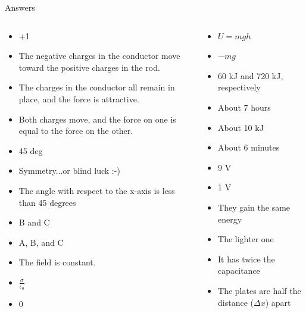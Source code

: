 \documentclass{beamer}
\begin{document}
\begin{frame}{Answers}
\small
\begin{columns}[T]
\begin{column}{0.5\textwidth}
\begin{itemize}
\item +1
\item The negative charges in the conductor move toward the positive charges in the rod.
\item The charges in the conductor all remain in place, and the force is attractive.
\item Both charges move, and the force on one is equal to the force on the other.
\item 45 deg
\item Symmetry...or blind luck :-)
\item The angle with respect to the x-axis is less than 45 degrees
\item B and C
\item A, B, and C
\item The field is constant.
\item $\frac{\sigma}{\epsilon_0}$
\item 0
\end{itemize}
\end{column}
\begin{column}{0.5\textwidth}
\begin{itemize}
\item $U = mgh$
\item $-mg$
\item 60 kJ and 720 kJ, respectively
\item About 7 hours
\item About 10 kJ
\item About 6 minutes
\item 9 V
\item 1 V
\item They gain the same energy
\item The lighter one
\item It has twice the capacitance
\item The plates are half the distance ($\Delta x$) apart
\end{itemize}
\end{column}
\end{columns}
\end{frame}
\end{document}
